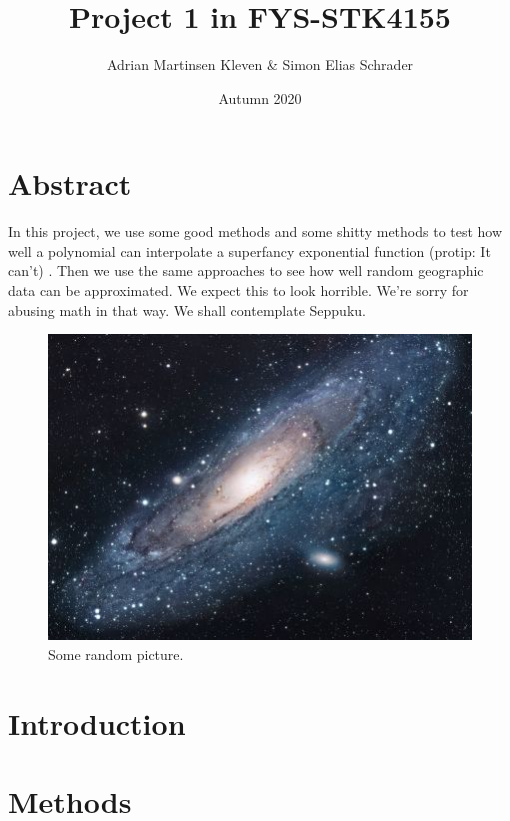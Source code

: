 \documentclass[11pt,a4paper]{article}
\title{Project 1 in FYS-STK4155}
\author{Adrian Martinsen Kleven & Simon Elias Schrader }
\date{Autumn 2020}
\begin{document}
\maketitle
\tableofcontents

\listoffigures
\listoftables


\clearpage
\section{Abstract}
In this project, we use some good methods and some shitty methods to test how well a polynomial can interpolate a superfancy exponential function (protip: It can't) . Then we use the same approaches to see how well random geographic data can be approximated. We expect this to look horrible. We're sorry for abusing math in that way. We shall contemplate Seppuku.

\begin{figure}[H]
\centering
\includegraphics[scale=1.7]{universe}
\caption{Some random picture.}
\label{fig:universe}
\end{figure}
\section{Introduction}
\section{Methods}
\end{document}
